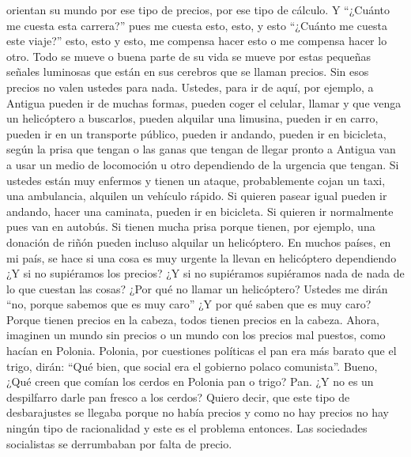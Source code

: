 orientan su mundo por ese tipo de precios, por ese tipo de cálculo. Y \enquote{¿Cuánto me cuesta esta carrera?} pues me cuesta esto, esto, y esto \enquote{¿Cuánto me cuesta este viaje?} esto, esto y esto, me compensa hacer esto o me compensa hacer lo otro. Todo se mueve o buena parte de su vida se mueve por estas pequeñas señales luminosas que están en sus cerebros que se llaman precios. Sin esos precios no valen ustedes para nada. Ustedes, para ir de aquí, por ejemplo, a Antigua pueden ir de muchas formas, pueden coger el celular, llamar y que venga un helicóptero a buscarlos, pueden alquilar una limusina, pueden ir en carro, pueden ir en un transporte público, pueden ir andando, pueden ir en bicicleta, según la prisa que tengan o las ganas que tengan de llegar pronto a Antigua van a usar un medio de locomoción u otro dependiendo de la urgencia que tengan. Si ustedes están muy enfermos y tienen un ataque, probablemente cojan un taxi, una ambulancia, alquilen un vehículo rápido. Si quieren pasear igual pueden ir andando, hacer una caminata, pueden ir en bicicleta. Si quieren ir normalmente pues van en autobús. Si tienen mucha prisa porque tienen, por ejemplo, una donación de riñón pueden incluso alquilar un helicóptero. En muchos países, en mi país, se hace si una cosa es muy urgente la llevan en helicóptero dependiendo ¿Y si no supiéramos los precios? ¿Y si no supiéramos supiéramos nada de nada de lo que cuestan las cosas? ¿Por qué no llamar un helicóptero? Ustedes me dirán \enquote{no, porque sabemos que es muy caro} ¿Y por qué saben que es muy caro? Porque tienen precios en la cabeza, todos tienen precios en la cabeza. Ahora, imaginen un mundo sin precios o un mundo con los precios mal puestos, como hacían en Polonia. Polonia, por cuestiones políticas el pan era más barato que el trigo, dirán: \enquote{Qué bien, que social era el gobierno polaco comunista}. Bueno, ¿Qué creen que comían los cerdos en Polonia pan o trigo? Pan. ¿Y no es un despilfarro darle pan fresco a los cerdos? Quiero decir, que este tipo de desbarajustes se llegaba porque no había precios y como no hay precios no hay ningún tipo de racionalidad y este es el problema entonces. Las sociedades socialistas se derrumbaban por falta de precio.

